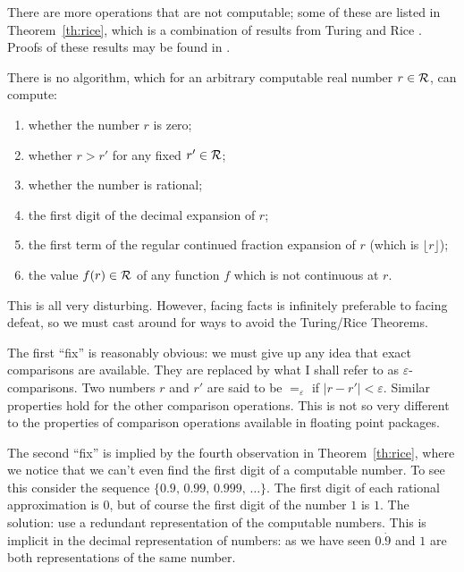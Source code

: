 There are more operations that are not computable; some of these are
listed in Theorem~\ref{th:rice}, which is a combination of results
from Turing  and Rice . Proofs
of these results may be found in \cite{VUILLEMIN87a}.

\begin{theorem}\label{th:rice}

There is no algorithm, which for an arbitrary computable real number
$r\in{\cal R}$, can compute:
\begin{enumerate}
\item whether the number $r$ is zero;
\item whether $r > r'$ for any fixed $r'\in {\cal R}$;
\item whether the number is rational;
\item the first digit of the decimal expansion of $r$;
\item the first term of the regular continued fraction expansion of
$r$ (which is $\lfloor r\rfloor$);
\item the value $f(r)\in {\cal R}$ of any function $f$ which is not
continuous at $r$.
\end{enumerate}
\end{theorem}

This is all very disturbing. However, facing facts is infinitely
preferable to facing defeat, so we must cast around for ways to avoid
the Turing/Rice Theorems.

The first ``fix'' is reasonably obvious: we must give up any idea that
exact comparisons are available. They are replaced by what I shall
refer to as $\varepsilon$-comparisons. Two numbers $r$ and $r'$ are
said to be ${=}_\varepsilon$ if $|r-r'| < \varepsilon$. Similar
properties hold for the other comparison operations. This is not so
very different to the properties of comparison operations available in
floating point packages.

The second ``fix'' is implied by the fourth observation in
Theorem~\ref{th:rice}, where we notice that we can't even find the
first digit of a computable number. To see this consider the sequence
$\{0.9,\,0.99,\,0.999,\,\ldots\}$.  The first digit of each rational
approximation is $0$, but of course the first digit of the number $1$
is $1$. The solution: use a redundant representation of the computable
numbers. This is implicit in the decimal representation of numbers: as
we have seen $0.\dot{9}$ and $1$ are both representations of the same
number.

